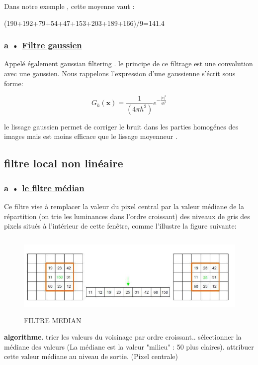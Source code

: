 \documentclass[12pt,a4paper]{report}
\numberwithin{equation}{subsection}
\numberwithin{equation}{section}
\begin{document}
Dans notre exemple , cette moyenne vaut :

\newline 

\begin{center}
    (190+192+79+54+47+153+203+189+166)/9=141.4
\end{center}
\subsubsection{a • \underline{ Filtre gaussien}}
Appelé également gaussian filtering .
le principe de ce filtrage est une convolution avec une gaussien. \newline
Nous rappelons l'expression d'une gaussienne s'écrit sous forme:
\begin{figure}[h!]
   $$G_{h}(\mathbf{x})=\frac{1}{\left(4 \pi h^{2}\right)} e^{-\frac{|x|^{2}}{4 h^{2}}}$$
\end{figure}
\newline
le lissage gaussien permet de corriger le bruit dans les parties homogénes des images mais est moins efficace que le lissage moyenneur .

\subsection{filtre local non linéaire}
\subsubsection{a • \underline{ le filtre médian}}
Ce filtre vise à remplacer la valeur du pixel central par la valeur médiane de la répartition (on trie les luminances dans l'ordre croissant) des niveaux de gris des pixels situés à l'intérieur de cette fenêtre, comme l’illustre la figure
suivante:\newline
\begin{figure}[!h]
    \centering
    \includegraphics[height=4cm , width=.5\textwidth]{median1.png}
    \caption{FILTRE MEDIAN}
\end{figure}
\newline
\textbf{algorithme}. trier les valeurs du voisinage par ordre croissant.. sélectionner la médiane des valeurs
(La médiane est la valeur "milieu" : 50 %
plus claires). attribuer cette valeur médiane au niveau de sortie. (Pixel centrale)\newline
\end{document}
